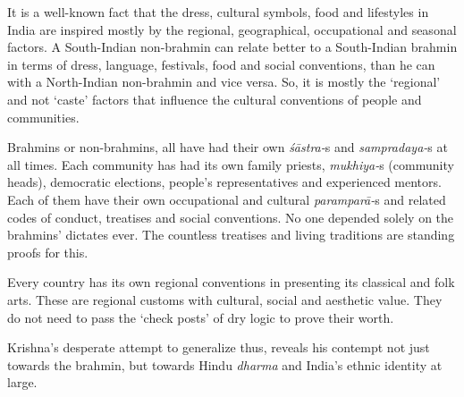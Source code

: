 It is a well-known fact that the dress, cultural symbols, food and lifestyles in India are inspired mostly by the regional, geographical, occupational and seasonal factors. A South-Indian non-brahmin can relate better to a South-Indian brahmin in terms of dress, language, festivals, food and social conventions, than he can with a North-Indian non-brahmin and vice versa. So, it is mostly the ‘regional’ and not ‘caste’ factors that influence the cultural conventions of people and communities.

Brahmins or non-brahmins, all have had their own \textit{śāstra-}s and \textit{sampradaya-}s at all times. Each community has had its own family priests, \textit{mukhiya-}s (community heads), democratic elections, people’s representatives and experienced mentors. Each of them have their own occupational and cultural \textit{paramparā-}s and related codes of conduct, treatises and social conventions. No one depended solely on the brahmins’ dictates ever. The countless treatises and living traditions are standing proofs for this.

Every country has its own regional conventions in presenting its classical and folk arts. These are regional customs with cultural, social and aesthetic value. They do not need to pass the ‘check posts’ of dry logic to prove their worth.

Krishna’s desperate attempt to generalize thus, reveals his contempt not just towards the brahmin, but towards Hindu \textit{dharma} and India’s ethnic identity at large.

